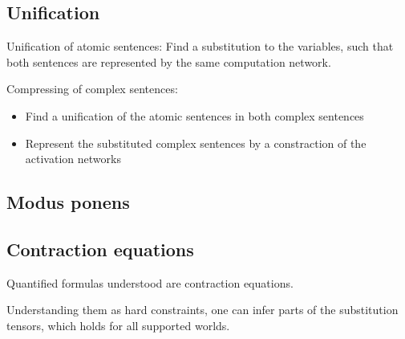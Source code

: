 \subsection{Unification}

Unification of atomic sentences: Find a substitution to the variables, such that both sentences are represented by the same computation network.

Compressing of complex sentences:
\begin{itemize}
    \item Find a unification of the atomic sentences in both complex sentences
    \item Represent the substituted complex sentences by a constraction of the activation networks
\end{itemize}

\subsection{Modus ponens}



\subsection{Contraction equations}

Quantified formulas understood are contraction equations.

Understanding them as hard constraints, one can infer parts of the substitution tensors, which holds for all supported worlds.

